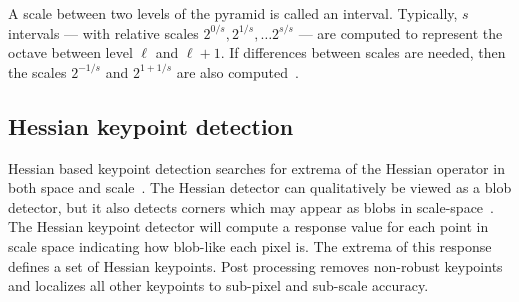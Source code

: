             A scale between two levels of the pyramid is called an
              interval.
            Typically, $s$ intervals --- with relative scales $2^{0/s},
              2^{1/s}, \ldots 2^{s/s}$ --- are computed to represent the
              octave between level $\ell$ and $\ell + 1$.
            If differences between scales are needed, then the scales
              $2^{-1/s}$ and $2^{1 + 1/s}$ are also
              computed~\cite{lowe_distinctive_2004}.


            \begin{comment}

            t = 20
            x = np.arange(t ** 2).reshape((t, t))

            l = 3
            pt1 = np.array([4, 2, 4, 2, 8, 8])
            pt2 = np.array([4, 2, 2, 4, 4, 4])
            print(x)
            print(xL)
            l2 = (2 ** l)
            xL = x[::l2, ::l2]
            pt1L = (pt1 / l2).astype(np.int32)
            pt2L = (pt2 / l2).astype(np.int32)
            res1 = xL[pt1L, pt2L]
            res2 = x[pt1, pt2]
            print('res1 = %
            print('res2 = %
            
            \end{comment}


    \subsection{Hessian keypoint detection}

        Hessian based keypoint detection searches for extrema of the
          Hessian operator in both space and
          scale~\cite{beaudet_rotationally_1978,
          lindeberg_shapeadapted_1994}.
        The Hessian detector can qualitatively be viewed as a blob
          detector, but it also detects corners which may appear as blobs
          in scale-space~\cite{tuytelaars_local_2007}.
        The Hessian keypoint detector will compute a response value for
          each point in scale space indicating how blob-like each pixel
          is.
        The extrema of this response defines a set of Hessian
          keypoints.
        Post processing removes non-robust keypoints and localizes all
          other keypoints to sub-pixel and sub-scale accuracy.

